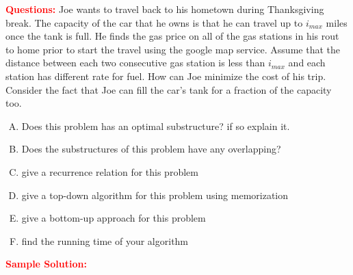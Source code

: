 \problem
\textcolor{Red}{\textbf{Questions:}}
Joe wants to travel back to his hometown during Thanksgiving break. The capacity of the car that he owns is that he can travel up to $i_{max}$ miles once the tank is full. He finds the gas price on all of the gas stations in his rout to home prior to start the travel using the google map service. Assume that the distance between each two consecutive gas station is less than $i_{max}$ and each station has different rate for fuel. How can Joe minimize the cost of his trip. Consider the fact that Joe can fill the car's tank for a fraction of the capacity too.
\begin{enumerate}[A.]
	\item Does this problem has an optimal substructure? if so explain it.
	\item Does the substructures of this problem have any overlapping?
	\item give a recurrence relation for this problem
	\item give a top-down algorithm for this problem using memorization
	\item give a bottom-up approach for this problem
	\item find the running time of your algorithm
\end{enumerate}


\textcolor{Red}{\textbf{Sample Solution:}}

